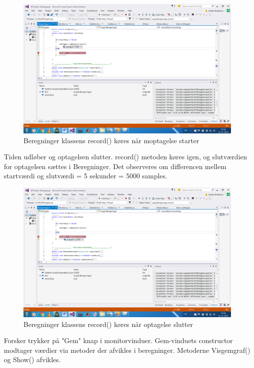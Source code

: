 \begin{figure}[H]
	\centering
	\includegraphics[width=1\textwidth]{Figurer/UC6_Record_Start}
	\caption{Beregninger klassens record() køres når moptagelse starter}
\end{figure}

Tiden udløber og optagelsen slutter. record() metoden køres igen, og slutværdien for optagelsen sættes i Beregninger. Det observeres om differencen mellem startværdi og slutværdi = 5 sekunder = 5000 samples.

\begin{figure}[H]
	\centering
	\includegraphics[width=1\textwidth]{Figurer/UC6_Record_Slut}
	\caption{Beregninger klassens record() køres når optagelse slutter}
\end{figure}

Forsker trykker på "Gem" knap i monitorvinduer. Gem-vinduets constructor modtager værdier via metoder der afvikles i beregninger. Metoderne Visgemgraf() og Show() afvikles.


